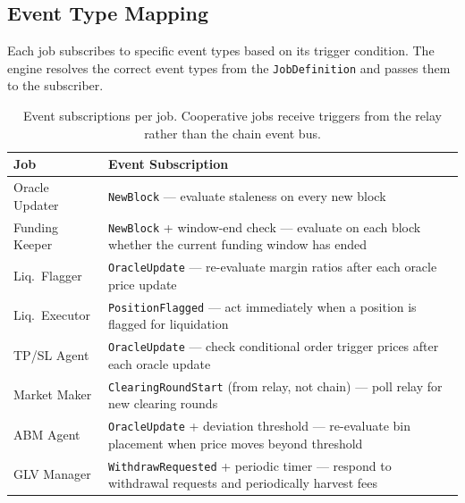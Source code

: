 \documentclass[11pt,a4paper]{article}
\begin{document}
\subsection{Event Type Mapping}

Each job subscribes to specific event types based on its trigger condition. The
engine resolves the correct event types from the \texttt{JobDefinition} and passes
them to the subscriber.

\begin{table}[H]
\centering
\small
\begin{tabularx}{\textwidth}{l X}
\toprule
\textbf{Job} & \textbf{Event Subscription} \\
\midrule
\rowcolor{keeper!8}
Oracle Updater & \texttt{NewBlock} --- evaluate staleness on every new block \\
\rowcolor{keeper!8}
Funding Keeper & \texttt{NewBlock} + window-end check --- evaluate on each block whether the current funding window has ended \\
\rowcolor{keeper!8}
Liq.\ Flagger & \texttt{OracleUpdate} --- re-evaluate margin ratios after each oracle price update \\
\rowcolor{operator!8}
Liq.\ Executor & \texttt{PositionFlagged} --- act immediately when a position is flagged for liquidation \\
\rowcolor{operator!8}
TP/SL Agent & \texttt{OracleUpdate} --- check conditional order trigger prices after each oracle update \\
\rowcolor{cooperative!8}
Market Maker & \texttt{ClearingRoundStart} (from relay, not chain) --- poll relay for new clearing rounds \\
\rowcolor{cooperative!8}
ABM Agent & \texttt{OracleUpdate} + deviation threshold --- re-evaluate bin placement when price moves beyond threshold \\
\rowcolor{managed!8}
GLV Manager & \texttt{WithdrawRequested} + periodic timer --- respond to withdrawal requests and periodically harvest fees \\
\bottomrule
\end{tabularx}
\caption{Event subscriptions per job. Cooperative jobs receive triggers from the relay rather than the chain event bus.}
\end{table}
\end{document}
